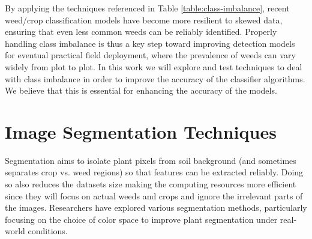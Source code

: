 \documentclass[letterpaper, notitlepage]{report}
\begin{document}
%
%
By applying the techniques referenced in Table \ref{table:class-imbalance}, recent weed/crop classification models have become more resilient to skewed data, ensuring that even less common weeds can be reliably identified. Properly handling class imbalance is thus a key step toward improving detection models for eventual practical field deployment, where the prevalence of weeds can vary widely from plot to plot. In this work we will explore and test
techniques to deal with class imbalance in order to improve the accuracy of the classifier algorithms. We believe that this is essential for enhancing the accuracy of the models.

\section{Image Segmentation Techniques}  
Segmentation aims to isolate plant pixels from soil background (and sometimes separates crop vs. weed regions) so that features can be extracted reliably. Doing so also reduces the datasets size making the computing resources more efficient since they will focus on actual weeds and crops and ignore the irrelevant parts of the images. Researchers have explored various segmentation methods, particularly focusing on the choice of color space to improve plant segmentation under real-world conditions.
%
\end{document}
